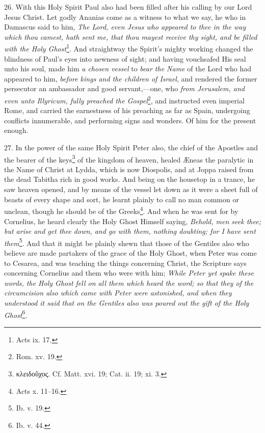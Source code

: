 26. With this Holy Spirit Paul also had been filled after his calling by our Lord Jesus Christ. Let godly Ananias come as a witness to what we say, he who in Damascus said to him, \emph{The Lord, even Jesus who appeared to thee in the way which thou camest, hath sent me, that thou mayest receive thy sight, and be filled with the Holy Ghost}\footnote{Acts ix. 17.}. And straightway the Spirit’s mighty working changed the blindness of Paul’s eyes into newness of sight; and having vouchsafed His seal unto his soul, made him \emph{a chosen vessel} to \emph{bear the Name} of the Lord who had appeared to him, \emph{before kings and the children of Israel}, and rendered the former persecutor an ambassador and good servant,—one, who \emph{from Jerusalem, and even unto Illyricum, fully preached the Gospel}\footnote{Rom. xv. 19.}, and instructed even imperial Rome, and carried the earnestness of his preaching as far as Spain, undergoing conflicts innumerable, and performing signs and wonders. Of him for the present enough.

27. In the power of the same Holy Spirit Peter also, the chief of the Apostles and the bearer of the keys\footnote{\textgreek{κλειδοῦχος}. Cf. Matt. xvi. 19; Cat. ii. 19; xi. 3.} of the kingdom of heaven, healed Æneas the paralytic in the Name of Christ at Lydda, which is now Diospolis, and at Joppa raised from the dead Tabitha rich in good works. And being on the housetop in a trance, he saw heaven opened, and by means of the vessel let down as it were a sheet full of beasts of every shape and sort, he learnt plainly to call no man common or unclean, though he should be of the Greeks\footnote{Acts x. 11–16.}. And when he was sent for by Cornelius, he heard clearly the Holy Ghost Himself saying, \emph{Behold, men seek thee; but arise and get thee down, and go with them, nothing doubting; for I have sent them}\footnote{Ib. v. 19.}. And that it might be plainly shewn that those of the Gentiles also who believe are made partakers of the grace of the Holy Ghost, when Peter was come to Cesarea, and was teaching the things concerning Christ, the Scripture says concerning Cornelius and them who were with him; \emph{While Peter yet spake these words, the Holy Ghost fell on all them which heard the word; so that they of the circumcision also which came with Peter were astonished, and when they understood it said that on the Gentiles also was poured out the gift of the Holy Ghost}\footnote{Ib. v. 44.}.

